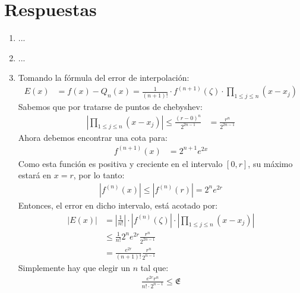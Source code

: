\documentclass[spanish, fleqn]{article}
\begin{document}
\section{Respuestas}
\begin{enumerate}
\item ...
\item ...
\item Tomando la fórmula del error de interpolación:
\begin{align*}
E(x) &= f(x) - Q_n(x) = \frac{1}{(n+1)!} \cdot f^{(n+1)}(\zeta) \cdot \prod_{1 \leq j \leq n} (x-x_j)
\end{align*}
Sabemos que por tratarse de puntos de chebyshev:
\begin{align*}
\left|\prod_{1 \leq j \leq n} (x-x_j)\right| \leq \frac{(r-0)^n}{2^{2n-1}} &= \frac{r^n}{2^{2n-1}}
\end{align*}
Ahora debemos encontrar una cota para:
\begin{align*}
f^{(n+1)}(x) &= 2^{n+1} e^{2x}
\end{align*}
Como esta función es positiva y creciente en el intervalo $[0,r]$, su máximo estará en $x=r$, por lo tanto:
\begin{align*}
|f^{(n)}(x)| \leq |f^{(n)}(r)| = 2^ne^{2r}
\end{align*}
Entonces, el error en dicho intervalo, está acotado por:
\begin{align*}
| E(x) | &=
\left| \frac{1}{n!} \right| \cdot
\left| f^{(n)}(\zeta) \right| \cdot
\left| \prod_{1 \leq j \leq n} (x-x_j) \right|
\\ &\leq \frac{1}{n!} 2^ne^{2r} \frac{r^n}{2^{2n-1}}
\\ &= \frac{e^{2r}}{(n+1)!} \frac{r^n}{2^{n-1}}
\end{align*}
Simplemente hay que elegir un $n$ tal que:
\begin{align*}
\frac{e^{2r}r^n}{n!\cdot 2^{n-1}}\leq \mathfrak{E}
\end{align*}
\end{enumerate}
\end{document}
